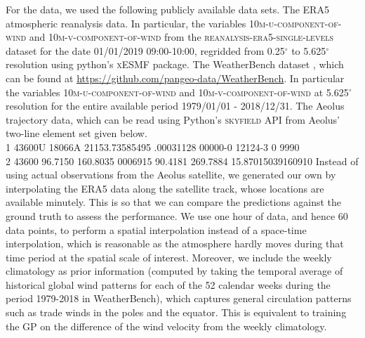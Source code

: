 For the data, we used the following publicly available data sets.
\1* The ERA5 atmospheric reanalysis data.
In particular, the variables \textsc{10m-u-component-of-wind} and \textsc{10m-v-component-of-wind} from the \textsc{reanalysis-era5-single-levels} dataset for the date 01/01/2019 09:00-10:00, regridded from 0.25$^\circ$ to 5.625$^\circ$ resolution using python's \textsc{xESMF} package.
\2* The WeatherBench dataset \cite{rasp2020weatherbench}, which can be found at \url{https://github.com/pangeo-data/WeatherBench}.
In particular the variables \textsc{10m-u-component-of-wind} and \textsc{10m-v-component-of-wind} at 5.625$^\circ$ resolution for the entire available period 1979/01/01 - 2018/12/31.
\3* The Aeolus trajectory data, which can be read using Python's \textsc{skyfield}
API from Aeolus' two-line element set given below.
\\
\textsc{1 43600U 18066A   21153.73585495  .00031128  00000-0  12124-3 0  9990} \\
\textsc{2 43600  96.7150 160.8035 0006915  90.4181 269.7884 15.87015039160910}
\0*
Instead of using actual observations from the Aeolus satellite, we generated our own by interpolating the ERA5 data along the satellite track, whose locations are available minutely.
This is so that we can compare the predictions against the ground truth to assess the performance.
We use one hour of data, and hence 60 data points, to perform a spatial interpolation instead of a space-time interpolation, which is reasonable as the atmosphere hardly moves during that time period at the spatial scale of interest.
Moreover, we include the weekly climatology as prior information (computed by taking the temporal average of historical global wind patterns for each of the 52 calendar weeks during the period 1979-2018 in WeatherBench), which captures general circulation patterns such as trade winds in the poles and the equator.
This is equivalent to training the GP on the difference of the wind velocity from the weekly climatology.

